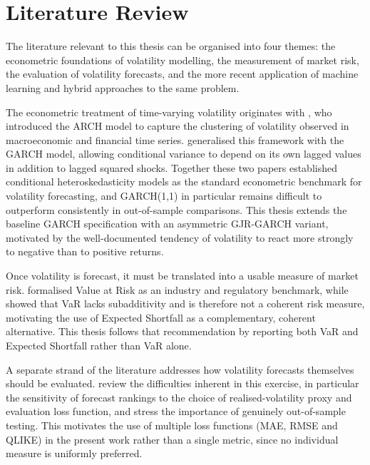 \documentclass[12pt,a4paper]{article}
\begin{document}
\section{Literature Review}
The literature relevant to this thesis can be organised into four themes: the
econometric foundations of volatility modelling, the measurement of market risk,
the evaluation of volatility forecasts, and the more recent application of machine
learning and hybrid approaches to the same problem.

The econometric treatment of time-varying volatility originates with
\citet{engle1982}, who introduced the ARCH model to capture the clustering of
volatility observed in macroeconomic and financial time series.
\citet{bollerslev1986} generalised this framework with the GARCH model, allowing
conditional variance to depend on its own lagged values in addition to lagged
squared shocks. Together these two papers established conditional
heteroskedasticity models as the standard econometric benchmark for volatility
forecasting, and GARCH(1,1) in particular remains difficult to outperform
consistently in out-of-sample comparisons. This thesis extends the baseline GARCH
specification with an asymmetric GJR-GARCH variant, motivated by the
well-documented tendency of volatility to react more strongly to negative than to
positive returns.

Once volatility is forecast, it must be translated into a usable measure of
market risk. \citet{jorion1997} formalised Value at Risk as an industry and
regulatory benchmark, while \citet{artzner1999} showed that VaR lacks
subadditivity and is therefore not a coherent risk measure, motivating the use of
Expected Shortfall as a complementary, coherent alternative. This thesis follows
that recommendation by reporting both VaR and Expected Shortfall rather than VaR
alone.

A separate strand of the literature addresses how volatility forecasts themselves
should be evaluated. \citet{poon2003} review the difficulties inherent in this
exercise, in particular the sensitivity of forecast rankings to the choice of
realised-volatility proxy and evaluation loss function, and stress the importance
of genuinely out-of-sample testing. This motivates the use of multiple loss
functions (MAE, RMSE and QLIKE) in the present work rather than a single metric,
since no individual measure is uniformly preferred.
\end{document}
